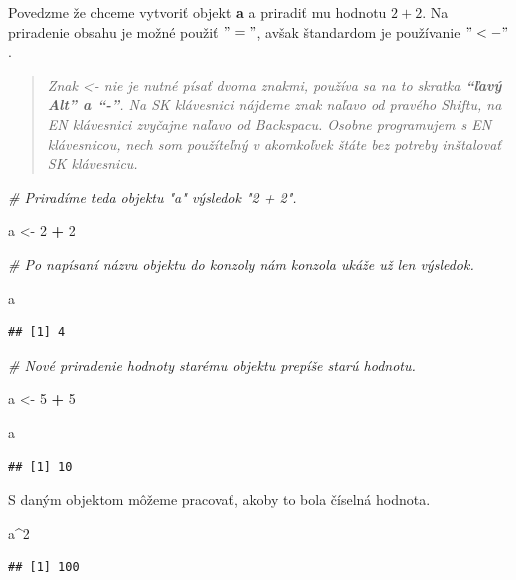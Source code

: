 \documentclass[]{article}
\newenvironment{Shaded}{\begin{snugshade}}{\end{snugshade}}
\newcommand{\CommentTok}[1]{\textcolor[rgb]{0.56,0.35,0.01}{\textit{#1}}}
\newcommand{\DecValTok}[1]{\textcolor[rgb]{0.00,0.00,0.81}{#1}}
\newcommand{\NormalTok}[1]{#1}
\newcommand{\OperatorTok}[1]{\textcolor[rgb]{0.81,0.36,0.00}{\textbf{#1}}}
\newcommand{\StringTok}[1]{\textcolor[rgb]{0.31,0.60,0.02}{#1}}
\begin{document}
Povedzme že chceme vytvoriť objekt \textbf{a} a priradiť mu hodnotu
\(2 + 2\). Na priradenie obsahu je možné použiť \("="\), avšak
štandardom je používanie \("<-"\).

\begin{quote}
\emph{Znak \textless- nie je nutné písať dvoma znakmi, používa sa na to
skratka \textbf{``ľavý Alt'' a ``-''}. Na SK klávesnici nájdeme znak
naľavo od pravého Shiftu, na EN klávesnici zvyčajne naľavo od Backspacu.
Osobne programujem s EN klávesnicou, nech som použíteľný v akomkoľvek
štáte bez potreby inštalovať SK klávesnicu.}
\end{quote}

\begin{Shaded}
\begin{Highlighting}[]
\CommentTok{# Priradíme teda objektu "a" výsledok "2 + 2".}

\NormalTok{a <-}\StringTok{ }\DecValTok{2} \OperatorTok{+}\StringTok{ }\DecValTok{2}

\CommentTok{# Po napísaní názvu objektu do konzoly nám konzola ukáže už len výsledok.}

\NormalTok{a}
\end{Highlighting}
\end{Shaded}

\begin{verbatim}
## [1] 4
\end{verbatim}

\begin{Shaded}
\begin{Highlighting}[]
\CommentTok{# Nové priradenie hodnoty starému objektu prepíše starú hodnotu.}

\NormalTok{a <-}\StringTok{ }\DecValTok{5} \OperatorTok{+}\StringTok{ }\DecValTok{5}

\NormalTok{a}
\end{Highlighting}
\end{Shaded}

\begin{verbatim}
## [1] 10
\end{verbatim}

S daným objektom môžeme pracovať, akoby to bola číselná hodnota.

\begin{Shaded}
\begin{Highlighting}[]
\NormalTok{a}\OperatorTok{^}\DecValTok{2}
\end{Highlighting}
\end{Shaded}

\begin{verbatim}
## [1] 100
\end{verbatim}
\end{document}
